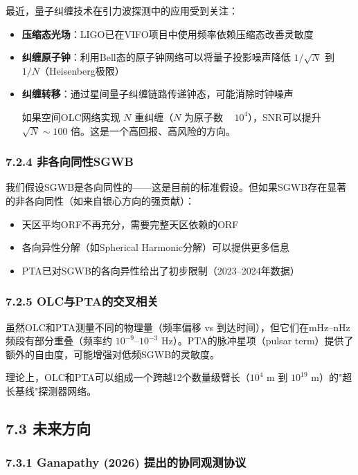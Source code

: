 \documentclass[12pt,a4paper]{article}
\begin{document}
最近，量子纠缠技术在引力波探测中的应用受到关注：
\begin{itemize}
  \item \textbf{压缩态光场}：LIGO已在VIFO项目中使用频率依赖压缩态改善灵敏度
  \item \textbf{纠缠原子钟}：利用Bell态的原子钟网络可以将量子投影噪声降低 $1/\sqrt{N}$ 到 $1/N$（Heisenberg极限）
  \item \textbf{纠缠转移}：通过星间量子纠缠链路传递钟态，可能消除时钟噪声

如果空间OLC网络实现 $N$ 重纠缠（$N$ 为原子数 ~ $10^4$），SNR可以提升 $\sqrt{N} \sim 100$ 倍。这是一个高回报、高风险的方向。

\end{itemize}
\subsubsection{7.2.4 非各向同性SGWB}


我们假设SGWB是各向同性的——这是目前的标准假设。但如果SGWB存在显著的非各向同性（如来自银心方向的强贡献）：

\begin{itemize}
  \item 天区平均ORF不再充分，需要完整天区依赖的ORF
  \item 各向异性分解（如Spherical Harmonic分解）可以提供更多信息
  \item PTA已对SGWB的各向异性给出了初步限制（2023–2024年数据）

\end{itemize}
\subsubsection{7.2.5 OLC与PTA的交叉相关}


虽然OLC和PTA测量不同的物理量（频率偏移 vs 到达时间），但它们在mHz–nHz频段有部分重叠（频率约 $10^{-9}$–$10^{-3}$ Hz）。PTA的脉冲星项（pulsar term）提供了额外的自由度，可能增强对低频SGWB的灵敏度。

理论上，OLC和PTA可以组成一个跨越12个数量级臂长（$10^4$ m 到 $10^{19}$ m）的"超长基线"探测器网络。

\subsection{7.3 未来方向}


\subsubsection{7.3.1 Ganapathy (2026) 提出的协同观测协议}
\end{document}
